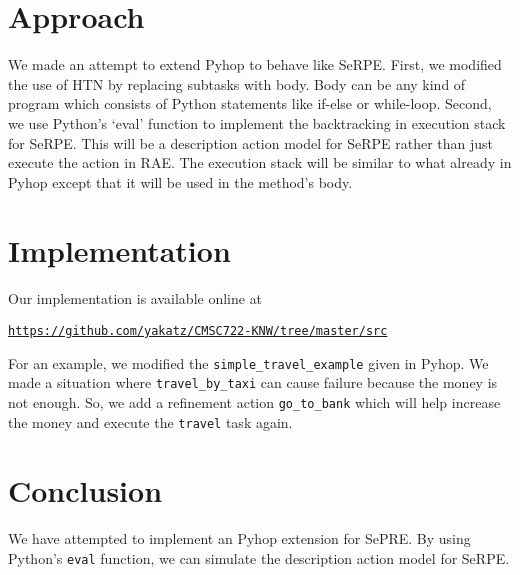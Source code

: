 \documentclass[11pt]{article} %
\begin{document}
\section{Approach}
We made an attempt to extend Pyhop to behave like SeRPE. 
First, we modified the use of HTN by replacing subtasks with 
body. Body can be any kind of program which consists of
 Python statements like if-else or while-loop.
Second, we use Python's `eval' function to implement the 
backtracking in execution stack for SeRPE. This will be a 
description action model for SeRPE rather than just execute
 the action in RAE. The execution stack will be similar to what
 already in Pyhop except that it will be used in the method's body.

\section{Implementation}

Our implementation is available online at
\begin{center}
\href{https://github.com/yakatz/CMSC722-KNW/tree/master/src}
{\tt https://github.com/yakatz/CMSC722-KNW/tree/master/src}
\end{center}

For an example, we modified the \texttt{simple\_travel\_example} given in Pyhop.
We made a situation where \texttt{travel\_by\_taxi} can cause failure because
the money is not enough. So, we add a refinement action \texttt{go\_to\_bank}
which will help increase the money and execute the \texttt{travel} task again.


\section{Conclusion}

We have attempted to implement an Pyhop extension for SePRE.
By using Python's \texttt{eval} function, we can simulate the description 
action model for SeRPE.



\end{document}
